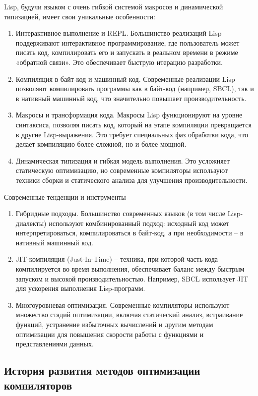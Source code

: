 Lisp, будучи языком с очень гибкой системой макросов и динамической типизацией, имеет свои уникальные особенности:
\begin{enumerate}
\item Интерактивное выполнение и REPL. Большинство реализаций Lisp поддерживают интерактивное программирование, где пользователь может писать код, компилировать его и запускать в реальном времени в режиме «обратной связи». Это обеспечивает быструю итерацию разработки.
\item Компиляция в байт-код и машинный код. Современные реализации Lisp позволяют компилировать программы как в байт-код (например, SBCL), так и в нативный машинный код, что значительно повышает производительность.
\item Макросы и трансформация кода. Макросы Lisp функционируют на уровне синтаксиса, позволяя писать код, который на этапе компиляции превращается в другие Lisp-выражения. Это требует специальных фаз обработки кода, что делает компиляцию более сложной, но и более мощной.
\item Динамическая типизация и гибкая модель выполнения. Это усложняет статическую оптимизацию, но современные компиляторы используют техники сборки и статического анализа для улучшения производительности.
\end{enumerate}

Современные тенденции и инструменты
\begin{enumerate}
\item Гибридные подходы. Большинство современных языков (в том числе Lisp-диалекты) используют комбинированный подход: исходный код может интерпретироваться, компилироваться в байт-код, а при необходимости -- в нативный машинный код.
\item JIT-компиляция (Just-In-Time) -- техника, при которой часть кода компилируется во время выполнения, обеспечивает баланс между быстрым запуском и высокой производительностью. Например, SBCL использует JIT для ускорения выполнения Lisp-программ.
\item Многоуровневая оптимизация. Современные компиляторы используют множество стадий оптимизации, включая статический анализ, встраивание функций, устранение избыточных вычислений и другим методам оптимизации для повышения скорости работы с функциями и представлениями данных.
\end{enumerate}

\subsection{История развития методов оптимизации компиляторов}


